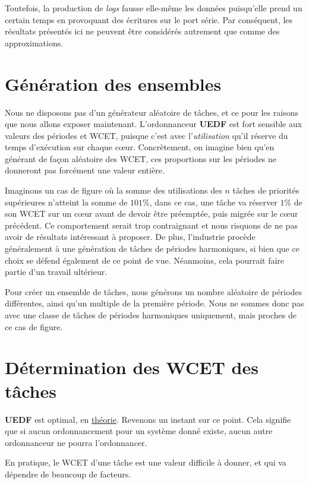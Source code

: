 	Toutefois, la production de \textit{logs}
	fausse elle-même les données puisqu'elle prend un certain temps en provoquant des écritures 
	sur le port série.
	Par conséquent, les résultats présentés ici ne peuvent 
	être considérés autrement que comme des approximations.
	
	
\section{Génération des ensembles}

Nous ne disposons pas d'un générateur aléatoire de tâches, et ce pour les raisons que nous allons exposer maintenant.
L'ordonnanceur \textbf{UEDF} est fort sensible aux valeurs des périodes et WCET, puisque 
c'est avec l'\textit{utilisation} qu'il réserve du temps d'exécution sur chaque cœur. 
Concrètement, on imagine bien qu'en générant de façon aléatoire des WCET, ces proportions sur les 
périodes ne donneront pas forcément une valeur entière.\newline

Imaginons un cas de figure où la somme des utilisations des $n$ tâches de priorités supérieures 
n'atteint la somme de $101\%$, dans ce cas, une tâche va réserver $1\%$ de son WCET 
sur un cœur avant de devoir être préemptée, puis migrée sur le cœur précédent. Ce comportement 
serait trop contraignant et nous risquons de ne pas avoir de résultats intéressant à 
proposer. De plus, l'industrie procède généralement à une génération de tâches de périodes harmoniques, 
si bien que ce choix se défend également de ce point de vue.
Néanmoins, cela pourrait faire partie d'un travail ultérieur.\newline

Pour créer un ensemble de tâches, nous générons un nombre aléatoire de périodes différentes, 
ainsi qu'un multiple de la première période. Nous ne sommes donc pas 
avec une classe de tâches de périodes harmoniques uniquement, 
mais proches de ce cas de figure. 	

\section{Détermination des WCET des tâches}\label{methodo}
	\textbf{UEDF} est optimal, en \underline{théorie}. Revenons un instant sur ce point. 
	Cela signifie que si aucun ordonnancement pour un système donné existe, 
	aucun autre ordonnanceur ne pourra l'ordonnancer.\newline

	En pratique, le WCET d'une tâche est une valeur difficile à donner, et qui va dépendre de 
	beaucoup de facteurs.\newline
	
